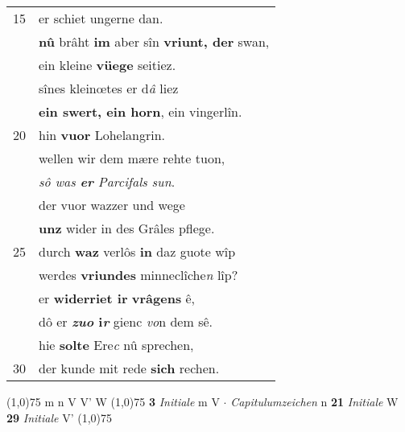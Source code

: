 \documentclass[8pt,a4paper,notitlepage]{article}
\begin{document}
\begin{table}[ht]
\begin{minipage}[t]{0.5\linewidth}
\begin{tabular}{rl}
15 & er schiet ungerne dan.\\ 
 & \textbf{nû} brâht \textbf{im} aber sîn \textbf{vriunt, der} swan,\\ 
 & ein kleine \textbf{vüege} seitiez.\\ 
 & sînes kleinœtes er d\textit{â} liez\\ 
 & \textbf{ein swert, ein horn}, ein vingerlîn.\\ 
20 & hin \textbf{vuor} Lohelangrin.\\ 
 & wellen wir dem mære rehte tuon,\\ 
 & \textit{sô was \textbf{er} Parcifals sun}.\\ 
 & der vuor wazzer und wege\\ 
 & \textbf{unz} wider in des Grâles pflege.\\ 
25 & durch \textbf{waz} verlôs \textbf{in} daz guote wîp\\ 
 & werdes \textbf{vriundes} minneclîche\textit{n} lîp?\\ 
 & er \textbf{widerriet ir} \textbf{vrâgens} ê,\\ 
 & dô er \textbf{\textit{zuo} i\textit{r}} gienc \textit{vo}n dem sê.\\ 
 & hie \textbf{solte} Ere\textit{c} nû sprechen,\\ 
30 & der kunde mit rede \textbf{sich} rechen.\\ 
\end{tabular}
\scriptsize
\line(1,0){75} \newline
m n V V' W \newline
\line(1,0){75} \newline
\textbf{3} \textit{Initiale} m V   $\cdot$ \textit{Capitulumzeichen} n  \textbf{21} \textit{Initiale} W  \textbf{29} \textit{Initiale} V'  \newline
\line(1,0){75} \newline

\end{minipage}
\end{table}
\end{document}
